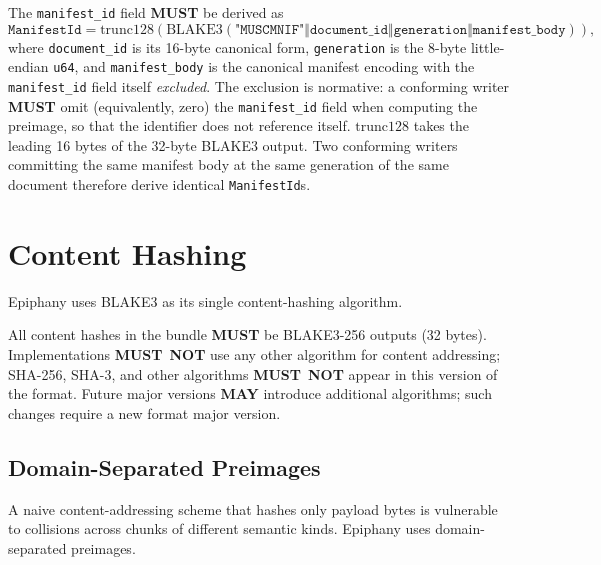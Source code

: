 \documentclass[11pt,letterpaper]{report}
\newcounter{requirement}[chapter]
\newcommand{\MUST}{\textbf{MUST}}
\newcommand{\MUSTNOT}{\textbf{MUST}\nobreak\ \textbf{NOT}}
\newcommand{\MAY}{\textbf{MAY}}
\begin{document}
\begin{requirement}
  \label{req:format:manifest-id}
  The \texttt{manifest\_id} field \MUST{} be derived as
  \[
    \texttt{ManifestId} = \mathrm{trunc128}\!\left(
      \mathrm{BLAKE3}(\texttt{"MUSCMNIF"} \Vert \texttt{document\_id}
      \Vert \texttt{generation} \Vert \texttt{manifest\_body})\right),
  \]
  where \texttt{document\_id} is its 16-byte canonical form,
  \texttt{generation} is the 8-byte little-endian \texttt{u64}, and
  \texttt{manifest\_body} is the canonical manifest encoding with the
  \texttt{manifest\_id} field itself \emph{excluded}. The exclusion is
  normative: a conforming writer \MUST{} omit (equivalently, zero) the
  \texttt{manifest\_id} field when computing the preimage, so that the
  identifier does not reference itself. $\mathrm{trunc128}$ takes the
  leading 16 bytes of the 32-byte BLAKE3 output. Two conforming
  writers committing the same manifest body at the same generation of
  the same document therefore derive identical \texttt{ManifestId}s.
\end{requirement}

\section{Content Hashing}
\label{sec:format:hashing}

Epiphany uses BLAKE3 as its single content-hashing algorithm.

\begin{requirement}
  \label{req:format:blake3-content-hashes}
  All content hashes in the bundle \MUST{} be BLAKE3-256 outputs
  (32 bytes). Implementations \MUSTNOT{} use any other algorithm
  for content addressing; SHA-256, SHA-3, and other algorithms
  \MUSTNOT{} appear in this version of the format. Future major
  versions \MAY{} introduce additional algorithms; such changes
  require a new format major version.
\end{requirement}

\subsection{Domain-Separated Preimages}

A naive content-addressing scheme that hashes only payload bytes is
vulnerable to collisions across chunks of different semantic kinds.
Epiphany uses domain-separated preimages.
\end{document}
